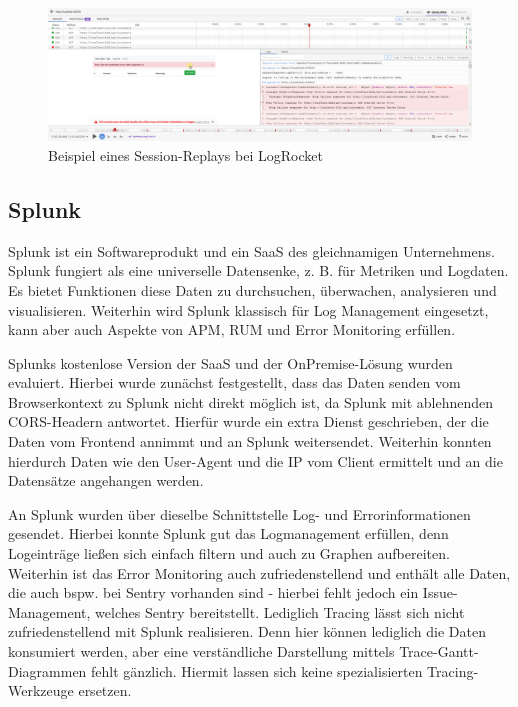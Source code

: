 \begin{figure}[H]
	\centering
	\includegraphics[width=\linewidth]{img/03_methoden/logrocket_session-replay-example.png}
	\caption{Beispiel eines Session-Replays bei LogRocket}
	\label{fig:logrocket-session-replay-example}
\end{figure}

\subsection{Splunk}

Splunk \cite{Splunk} ist ein Softwareprodukt und ein SaaS des gleichnamigen Unternehmens. Splunk fungiert als eine universelle Datensenke, z. B. für Metriken und Logdaten. Es bietet Funktionen diese Daten zu durchsuchen, überwachen, analysieren und visualisieren. Weiterhin wird Splunk klassisch für Log Management eingesetzt, kann aber auch Aspekte von APM, RUM und Error Monitoring erfüllen.

Splunks kostenlose Version der SaaS und der OnPremise-Lösung wurden evaluiert. Hierbei wurde zunächst festgestellt, dass das Daten senden vom Browserkontext zu Splunk nicht direkt möglich ist, da Splunk mit ablehnenden CORS-Headern antwortet. Hierfür wurde ein extra Dienst geschrieben, der die Daten vom Frontend annimmt und an Splunk weitersendet. Weiterhin konnten hierdurch Daten wie den User-Agent und die IP vom Client ermittelt und an die Datensätze angehangen werden.

An Splunk wurden über dieselbe Schnittstelle Log- und Errorinformationen gesendet. Hierbei konnte Splunk gut das Logmanagement erfüllen, denn Logeinträge ließen sich einfach filtern und auch zu Graphen aufbereiten. Weiterhin ist das Error Monitoring auch zufriedenstellend und enthält alle Daten, die auch bspw. bei Sentry vorhanden sind - hierbei fehlt jedoch ein Issue-Management, welches Sentry bereitstellt. Lediglich Tracing lässt sich nicht zufriedenstellend mit Splunk realisieren. Denn hier können lediglich die Daten konsumiert werden, aber eine verständliche Darstellung mittels Trace-Gantt-Diagrammen fehlt gänzlich. Hiermit lassen sich keine spezialisierten Tracing-Werkzeuge ersetzen.

